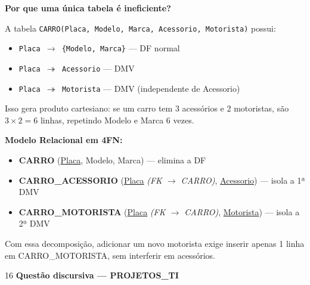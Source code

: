 \documentclass[12pt]{article}
\begin{document}
\begin{respdisc}
\textbf{Por que uma única tabela é ineficiente?}

A tabela \texttt{CARRO(Placa, Modelo, Marca, Acessorio, Motorista)} possui:
\begin{itemize}
  \item \texttt{Placa $\to$ \{Modelo, Marca\}} — DF normal
  \item \texttt{Placa $\twoheadrightarrow$ Acessorio} — DMV
  \item \texttt{Placa $\twoheadrightarrow$ Motorista} — DMV (independente de Acessorio)
\end{itemize}
Isso gera produto cartesiano: se um carro tem 3 acessórios e 2 motoristas, são $3 \times 2 = 6$ linhas, repetindo Modelo e Marca 6 vezes.

\medskip
\textbf{Modelo Relacional em 4FN:}

\begin{itemize}
  \item \textbf{CARRO} (\underline{Placa}, Modelo, Marca) \quad — elimina a DF
  \item \textbf{CARRO\_ACESSORIO} (\underline{Placa} \textit{(FK $\to$ CARRO)}, \underline{Acessorio}) \quad — isola a 1ª DMV
  \item \textbf{CARRO\_MOTORISTA} (\underline{Placa} \textit{(FK $\to$ CARRO)}, \underline{Motorista}) \quad — isola a 2ª DMV
\end{itemize}

Com essa decomposição, adicionar um novo motorista exige inserir apenas 1 linha em CARRO\_MOTORISTA, sem interferir em acessórios.
\end{respdisc}

\vspace{0.5cm}

\begin{gabbox}{16}
\textbf{Questão discursiva — PROJETOS\_TI}
\end{gabbox}
\end{document}
